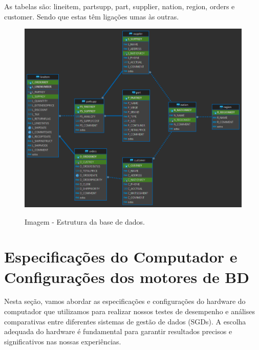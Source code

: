 \documentclass{article}
\begin{document}
As tabelas são: lineitem, partsupp, part, supplier, nation, region, orders e customer. Sendo que estas têm ligações umas às outras.
\begin{figure}[H]
  \centering
  \includegraphics[width=\textwidth]{Graphs/tpchassignment.png}\\
  \caption{Imagem - Estrutura da base de dados.}
  \label{fig:row_import_time}
\end{figure}

\clearpage


\section{Especificações do Computador e Configurações dos motores de BD}

\texttt{}\par Nesta seção, vamos abordar as especificações e configurações do hardware do computador que utilizamos para realizar nossos testes de desempenho e análises comparativas entre diferentes sistemas de gestão de dados (SGDs). A escolha adequada do hardware é fundamental para garantir resultados precisos e significativos nas nossas experiências.\\
\end{document}
